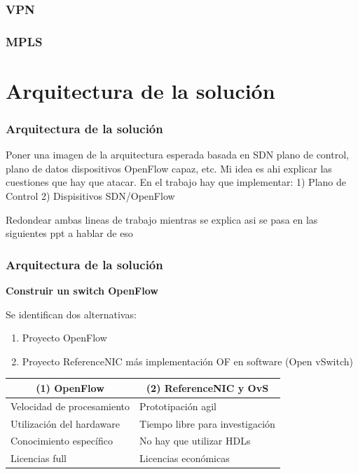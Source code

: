 \documentclass{beamer}
\begin{document}
\begin{frame}
\frametitle{VPN} 

\end{frame}

\begin{frame}
\frametitle{MPLS} 

\end{frame}

\section{Arquitectura de la soluci\'on} 

\begin{frame}
\frametitle{Arquitectura de la soluci\'on} 

Poner una imagen de la arquitectura esperada basada en SDN
plano de control, plano de datos dispositivos OpenFlow capaz, etc. Mi idea es ahi explicar
las cuestiones que hay que atacar. En el trabajo hay que implementar:
1) Plano de Control
2) Dispisitivos SDN/OpenFlow

Redondear ambas lineas de trabajo mientras se explica asi se pasa en las siguientes ppt a hablar de eso

\end{frame}

\begin{frame}
\frametitle{Arquitectura de la soluci\'on} 

\textbf{Construir un switch OpenFlow} 

\vspace{0.3cm}
Se identifican dos alternativas: 
\begin{enumerate}
\item Proyecto OpenFlow
\item Proyecto ReferenceNIC m\'as implementaci\'on OF en software (Open vSwitch)
\end{enumerate}

\begin{table}[]
\small
\centering
\label{label}
\begin{tabular}{| p{5cm} | p{5cm} |}

\hline
\multicolumn{1}{|c|}{(1) OpenFlow } & \multicolumn{1}{c|}{(2) ReferenceNIC y OvS } \\
\hline
Velocidad de procesamiento & Prototipaci\'on agil \\
Utilizaci\'on del hardaware &  Tiempo libre para investigaci\'on \\
Conocimiento espec\'ifico &  No hay que utilizar HDLs \\
Licencias full &  Licencias econ\'omicas \\

\hline  
\end{tabular}
\end{table}

\end{frame}
\end{document}
